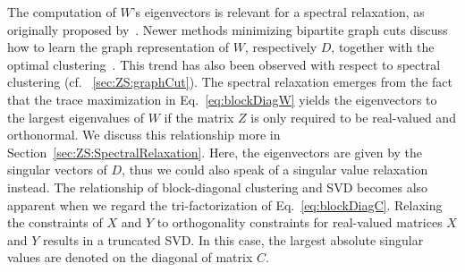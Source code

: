 The computation of $W$'s eigenvectors is relevant for a spectral relaxation, as originally proposed by~\cite{zha2001bipartite,dhillon2001co}. Newer methods minimizing bipartite graph cuts discuss how to learn the graph representation of $W$, respectively $D$, together with the optimal clustering~\citep{nie2017learning}. This trend has also been observed with respect to spectral clustering (cf. \@Section~\ref{sec:ZS:graphCut}).
The spectral relaxation emerges from the fact that the trace maximization in Eq.~\eqref{eq:blockDiagW} yields the eigenvectors to the largest eigenvalues of $W$ if the matrix $Z$ is only required to be real-valued and orthonormal. We discuss this relationship more in Section~\ref{sec:ZS:SpectralRelaxation}. Here, the eigenvectors are given by the singular vectors of $D$, thus we could also speak of a singular value relaxation instead. The relationship of block-diagonal clustering and SVD becomes also apparent when we regard the tri-factorization of Eq.~\eqref{eq:blockDiagC}. Relaxing the constraints of $X$ and $Y$ to orthogonality constraints for real-valued matrices $X$ and $Y$ results in a truncated SVD. In this case, the largest absolute singular values are denoted on the diagonal of matrix $C$.
